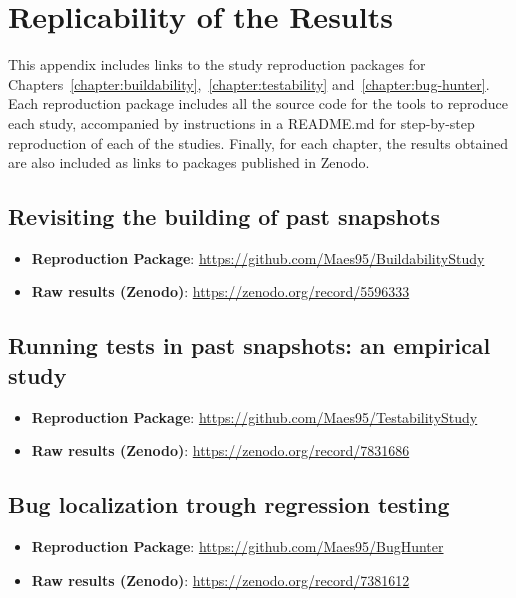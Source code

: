 \chapter{Replicability of the Results}
\label{appendix:replicability}

This appendix includes links to the study reproduction packages for Chapters~\ref{chapter:buildability},~\ref{chapter:testability} and~\ref{chapter:bug-hunter}. 
Each reproduction package includes all the source code for the tools to reproduce each study, accompanied by instructions in a README.md for step-by-step reproduction of each of the studies. 
Finally, for each chapter, the results obtained are also included as links to packages published in Zenodo.

\section{Revisiting the building of past snapshots}
\label{sec:buildability:repro}

\begin{itemize}[]
    \item \textbf{Reproduction Package}: \url{https://github.com/Maes95/BuildabilityStudy}
    \item \textbf{Raw results (Zenodo)}: \url{https://zenodo.org/record/5596333}
\end{itemize}

\section{Running tests in past snapshots: an empirical study}
\label{sec:testability:repro}

\begin{itemize}[]
    \item \textbf{Reproduction Package}: \url{https://github.com/Maes95/TestabilityStudy}
    \item \textbf{Raw results (Zenodo)}: \url{https://zenodo.org/record/7831686}
\end{itemize}

\section{Bug localization trough regression testing}
\label{sec:bug-hunter:repro}

\begin{itemize}[]
    \item \textbf{Reproduction Package}: \url{https://github.com/Maes95/BugHunter}
    \item \textbf{Raw results (Zenodo)}: \url{https://zenodo.org/record/7381612}
\end{itemize}